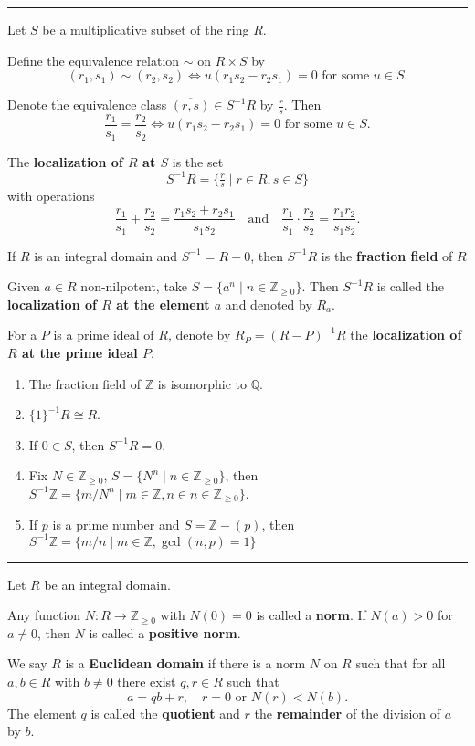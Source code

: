 \documentclass[12pt]{article}
\newcommand{\keyword}[1]{\textbf{#1}}
\newcommand{\sepline}{\rule{\textwidth}{0.4pt}}
\theoremstyle{definition}
\newcommand{\isp}[1]{\quad\text{#1}\quad}
\newcommand{\Z}{\mathbb{Z}}
\newcommand{\Zpos}{\mathbb{Z}_{\geq0}}
\newcommand{\Q}{\mathbb{Q}}
\newcommand{\<}{\left\langle}
\renewcommand{\>}{\right\rangle}
\newcommand{\isom}{\cong}
\newcommand{\eqc}{\overline}
\begin{document}
\sepline

Let $S$ be a multiplicative subset of the ring $R$.

Define the equivalence relation $\sim$ on $R \times S$ by
\[
    (r_1, s_1) \sim (r_2, s_2) \iff u(r_1s_2 - r_2s_1) = 0 \text{ for some } u \in S.
\]

Denote the equivalence class $\eqc{(r, s)} \in S^{-1}R$ by $\frac{r}{s}$. Then
\[
    \frac{r_1}{s_1} = \frac{r_2}{s_2} \iff u(r_1s_2 - r_2s_1) = 0 \text{ for some } u \in S.
\]

The \keyword{localization of $R$ at $S$} is the set
\[
    S^{-1}R = \{\tfrac{r}{s} \mid r \in R, s \in S\}
\]
with operations
\[
    \frac{r_1}{s_1} + \frac{r_2}{s_2} = \frac{r_1s_2 + r_2s_1}{s_1s_2}
    \isp{and}
    \frac{r_1}{s_1} \cdot \frac{r_2}{s_2} = \frac{r_1r_2}{s_1s_2}.
\]

If $R$ is an integral domain and $S^{-1} = R - 0$, then $S^{-1}R$ is the \keyword{fraction field} of $R$

Given $a \in R$ non-nilpotent, take $S = \{a^n \mid n \in \Zpos\}$. Then $S^{-1}R$ is called the \keyword{localization of $R$ at the element $a$} and denoted by $R_a$.

For a $P$ is a prime ideal of $R$, denote by $R_P = (R - P)^{-1}R$ the \keyword{localization of $R$ at the prime ideal $P$}.

\begin{enumerate}
    \item The fraction field of $\Z$ is isomorphic to $\Q$.
    
    \item $\{1\}^{-1}R \isom R$.
    
    \item If $0 \in S$, then $S^{-1}R = 0$.
    
    \item Fix $N \in \Zpos$, $S = \{N^n \mid n \in \Zpos\}$, then $S^{-1}\Z = \{m/N^n \mid m \in \Z, n \in n \in \Zpos\}$.
    
    \item If $p$ is a prime number and $S = \Z - (p)$, then $S^{-1}\Z = \{m/n \mid m \in \Z, \gcd(n, p) = 1\}$
\end{enumerate}
\sepline

Let $R$ be an integral domain.

Any function $N : R \to \Zpos$ with $N(0) = 0$ is called a \keyword{norm}. If $N(a) > 0$ for $a \ne 0$, then $N$ is called a \keyword{positive norm}.

We say $R$ is a \keyword{Euclidean domain} if there is a norm $N$ on $R$ such that for all $a, b \in R$ with $b \ne 0$ there exist $q, r \in R$ such that
\[
    a = qb + r, \quad r=0 \text{ or } N(r) < N(b).
\]
The element $q$ is called the \keyword{quotient} and $r$ the \keyword{remainder} of the division of $a$ by $b$.
\end{document}
